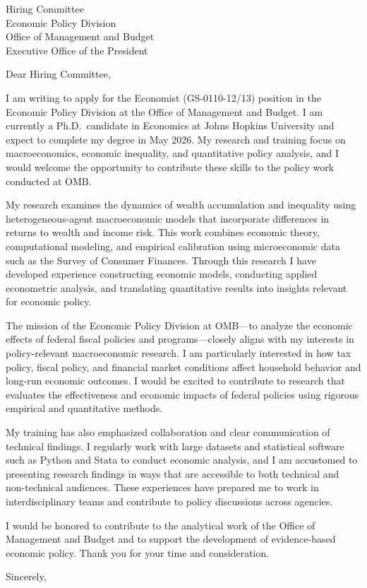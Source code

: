 \documentclass[11pt]{letter}
\begin{document}
\begin{letter}{Hiring Committee \\
Economic Policy Division \\
Office of Management and Budget \\
Executive Office of the President}

\opening{Dear Hiring Committee,}

I am writing to apply for the Economist (GS-0110-12/13) position in the Economic Policy Division at the Office of Management and Budget. I am currently a Ph.D.\ candidate in Economics at Johns Hopkins University and expect to complete my degree in May 2026. My research and training focus on macroeconomics, economic inequality, and quantitative policy analysis, and I would welcome the opportunity to contribute these skills to the policy work conducted at OMB.

My research examines the dynamics of wealth accumulation and inequality using heterogeneous-agent macroeconomic models that incorporate differences in returns to wealth and income risk. This work combines economic theory, computational modeling, and empirical calibration using microeconomic data such as the Survey of Consumer Finances. Through this research I have developed experience constructing economic models, conducting applied econometric analysis, and translating quantitative results into insights relevant for economic policy.

The mission of the Economic Policy Division at OMB—to analyze the economic effects of federal fiscal policies and programs—closely aligns with my interests in policy-relevant macroeconomic research. I am particularly interested in how tax policy, fiscal policy, and financial market conditions affect household behavior and long-run economic outcomes. I would be excited to contribute to research that evaluates the effectiveness and economic impacts of federal policies using rigorous empirical and quantitative methods.

My training has also emphasized collaboration and clear communication of technical findings. I regularly work with large datasets and statistical software such as Python and Stata to conduct economic analysis, and I am accustomed to presenting research findings in ways that are accessible to both technical and non-technical audiences. These experiences have prepared me to work in interdisciplinary teams and contribute to policy discussions across agencies.

I would be honored to contribute to the analytical work of the Office of Management and Budget and to support the development of evidence-based economic policy. Thank you for your time and consideration.

\closing{Sincerely,}

\end{letter}
\end{document}
